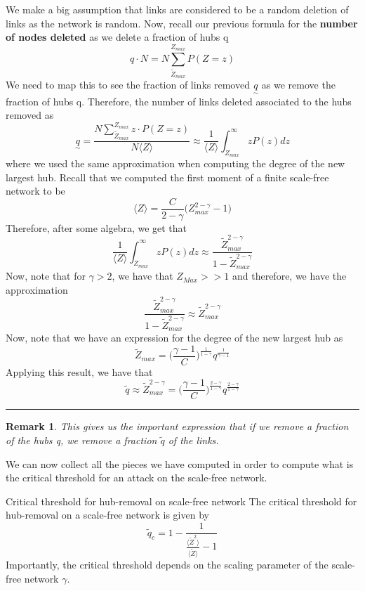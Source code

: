 \documentclass[twoside]{article}
\newcommand{\utilde}{\underset{\sim}}
\newtheorem{remark}[theorem]{Remark}
\newenvironment{proof}{{\bf Proof:}}{\hfill\rule{2mm}{2mm}}
\begin{document}
\begin{proof} We make a big assumption that links are considered to be a random deletion of links as the network is random. Now, recall our previous formula for the \textbf{number of nodes deleted} as we delete a fraction of hubs q 
$$
q \cdot N = N \sum_{\tilde{Z}_{max}}^{Z_{max}}P(Z = z)
$$
We need to map this to see the fraction of links removed $\utilde{q}$ as we remove the fraction of hubs q. Therefore, the number of links deleted associated to the hubs removed as 
$$
\utilde{q} = \frac{N \sum_{\tilde{Z}_{max}}^{Z_{max}} z \cdot P(Z = z)}{N \langle Z \rangle} \approx \frac{1}{\langle Z \rangle} \int_{Z_{max}}^{\infty} z P(z)dz
$$
where we used the same approximation when computing the degree of the new largest hub. Recall that we computed the first moment of a finite scale-free network to be 
$$
\langle Z \rangle = \frac{C}{2 - \gamma}\bigg(Z_{max}^{2 - \gamma} - 1 \bigg)
$$
Therefore, after some algebra, we get that 
$$
\frac{1}{\langle Z \rangle} \int_{Z_{max}}^{\infty} z P(z)dz \approx \frac{\tilde{Z}_{max}^{2 - \gamma}}{1 - \tilde{Z}_{max}^{2 - \gamma}}
$$
Now, note that for $\gamma > 2$, we have that $Z_{Max} >> 1$ and therefore, we have the approximation
$$
\frac{\tilde{Z}_{max}^{2 - \gamma}}{1 - \tilde{Z}_{max}^{2 - \gamma}} \approx \tilde{Z}_{max}^{2 - \gamma}
$$
Now, note that we have an expression for the degree of the new largest hub as 
$$
\tilde{Z}_{max} = \bigg(\frac{\gamma - 1}{C} \bigg)^{\frac{1}{1 - \gamma}}q^{\frac{1}{\gamma - 1}}
$$
Applying this result, we have that 
$$
\tilde{q} \approx \tilde{Z}_{max}^{2 - \gamma} = \bigg(\frac{\gamma - 1}{C}\bigg)^{\frac{2 - \gamma}{1 - \gamma}}q^{\frac{2 - \gamma}{1- \gamma}}
$$
\end{proof}

\begin{remark} This gives us the important expression that if we remove a fraction of the hubs q, we remove a fraction $\tilde{q}$ of the links.
\end{remark}

We can now collect all the pieces we have computed in order to compute what is the critical threshold for an attack on the scale-free network.
\begin{proposition_exam}{Critical threshold for hub-removal on scale-free network}{} The critical threshold for hub-removal on a scale-free network is given by 
$$
\tilde{q}_c = 1 - \frac{1}{\frac{\langle \tilde{Z}^2 \rangle}{\langle \tilde{Z} \rangle} - 1}
$$
Importantly, the critical threshold depends on the scaling parameter of the scale-free network $\gamma.$
\end{proposition_exam}
\end{document}
